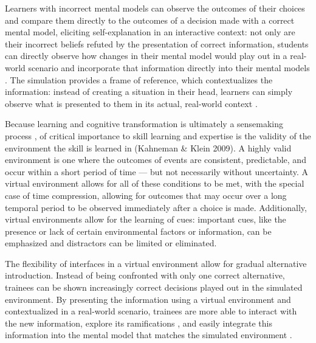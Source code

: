 Learners with incorrect mental models can observe the outcomes of their choices and compare them directly to the outcomes of a decision made with a correct mental model, eliciting self-explanation in an interactive context: not only are their incorrect beliefs refuted by the presentation of correct information, students can directly observe how changes in their mental model would play out in a real-world scenario and incorporate that information directly into their mental models \citep{Salzman1999}. The simulation provides a frame of reference, which contextualizes the information: instead of creating a situation in their head, learners can simply observe what is presented to them in its actual, real-world context \citep{Ericsson1993}.

Because learning and cognitive transformation is ultimately a sensemaking process \citep{Klein2006}, of critical importance to skill learning and expertise is the validity of the environment the skill is learned in (Kahneman \& Klein 2009). A highly valid environment is one where the outcomes of events are consistent, predictable, and occur within a short period of time — but not necessarily without uncertainty. A virtual environment allows for all of these conditions to be met, with the special case of time compression, allowing for outcomes that may occur over a long temporal period to be observed immediately after a choice is made. Additionally, virtual environments allow for the learning of cues: important cues, like the presence or lack of certain environmental factors or information, can be emphasized and distractors can be limited or eliminated.

The flexibility of interfaces in a virtual environment allow for gradual alternative introduction. Instead of being confronted with only one correct alternative, trainees can be shown increasingly correct decisions played out in the simulated environment. By presenting the information using a virtual environment and contextualized in a real-world scenario, trainees are more able to interact with the new information, explore its ramifications \citep{Ericsson1993}, and easily integrate this information into the mental model that matches the simulated environment \citep{Salzman1999}.

